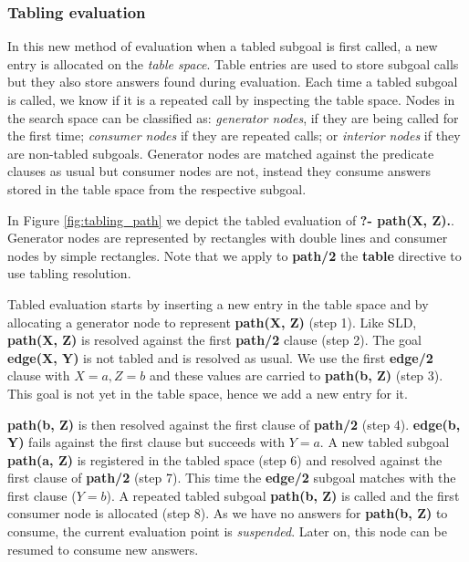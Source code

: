 \subsubsection{Tabling evaluation}

In this new method of evaluation when a tabled subgoal is first called, a new entry is allocated on the \textit{table space}. Table
entries are used to store subgoal calls but they also store answers found during evaluation. Each time a tabled subgoal is called, we
know if it is a repeated call by inspecting the table space. Nodes in the search space can be classified as:
\textit{generator nodes}, if they are being called for the first time; \textit{consumer nodes} if they are repeated calls;
or \textit{interior nodes} if they are non-tabled subgoals. Generator nodes are matched against the predicate clauses as usual but
consumer nodes are not, instead they consume answers stored in the table space from the respective subgoal.

In Figure \ref{fig:tabling_path} we depict the tabled evaluation of \textbf{?- path(X, Z).}.
Generator nodes are represented by rectangles with double lines and consumer nodes by simple rectangles.
Note that we apply to \textbf{path/2} the \textbf{table} directive to use tabling resolution.

Tabled evaluation starts by inserting a new entry in the table space and by allocating a generator
node to represent \textbf{path(X, Z)} (step 1). Like SLD, \textbf{path(X, Z)} is resolved against the first \textbf{path/2} clause (step 2).
The goal \textbf{edge(X, Y)} is not tabled and is resolved as usual. We use the first \textbf{edge/2} clause with $X = a, Z = b$
and these values are carried to \textbf{path(b, Z)} (step 3). This goal is not yet in the table space, hence we add a new entry for it.

\textbf{path(b, Z)} is then resolved against the first clause of \textbf{path/2} (step 4). \textbf{edge(b, Y)} fails against the first clause but succeeds
with $Y = a$. A new tabled subgoal \textbf{path(a, Z)} is registered in the tabled space (step 6) and resolved against the first clause
of \textbf{path/2} (step 7). This time the \textbf{edge/2} subgoal matches with the first clause ($Y = b$). A repeated tabled subgoal
\textbf{path(b, Z)} is called and the first consumer node is allocated (step 8). As we have no answers for \textbf{path(b, Z)} to consume,
the current evaluation point is \textit{suspended}. Later on, this node can be resumed to consume new answers.

